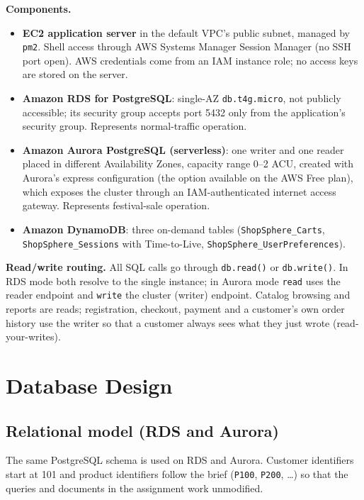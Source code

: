 \documentclass[11pt,a4paper]{article}
\begin{document}
\textbf{Components.}
\begin{itemize}
  \item \textbf{EC2 application server} in the default VPC's public subnet, managed by \texttt{pm2}. Shell access through AWS Systems Manager Session Manager (no SSH port open). AWS credentials come from an IAM instance role; no access keys are stored on the server.
  \item \textbf{Amazon RDS for PostgreSQL}: single-AZ \texttt{db.t4g.micro}, not publicly accessible; its security group accepts port 5432 only from the application's security group. Represents normal-traffic operation.
  \item \textbf{Amazon Aurora PostgreSQL (serverless)}: one writer and one reader placed in different Availability Zones, capacity range 0--2 ACU, created with Aurora's express configuration (the option available on the AWS Free plan), which exposes the cluster through an IAM-authenticated internet access gateway. Represents festival-sale operation.
  \item \textbf{Amazon DynamoDB}: three on-demand tables (\texttt{ShopSphere\_Carts}, \texttt{ShopSphere\_Sessions} with Time-to-Live, \texttt{ShopSphere\_UserPreferences}).
\end{itemize}

\textbf{Read/write routing.} All SQL calls go through \texttt{db.read()} or \texttt{db.write()}. In RDS mode both resolve to the single instance; in Aurora mode \texttt{read} uses the reader endpoint and \texttt{write} the cluster (writer) endpoint. Catalog browsing and reports are reads; registration, checkout, payment and a customer's own order history use the writer so that a customer always sees what they just wrote (read-your-writes).

\section{Database Design}

\subsection{Relational model (RDS and Aurora)}
The same PostgreSQL schema is used on RDS and Aurora. Customer identifiers start at 101 and product identifiers follow the brief (\texttt{P100}, \texttt{P200}, \dots) so that the queries and documents in the assignment work unmodified.
\end{document}
